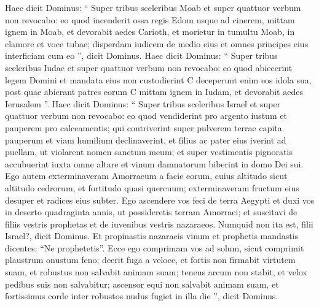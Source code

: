 \begin{biblechapter}
\begin{biblechapter}
 \verse Haec dicit Dominus:
 “ Super tribus sceleribus Moab
 et super quattuor verbum non revocabo:
 eo quod incenderit ossa regis Edom
 usque ad cinerem,
 \verse mittam ignem in Moab,
 et devorabit aedes Carioth,
 et morietur in tumultu Moab,
 in clamore et voce tubae;
 \verse disperdam iudicem de medio eius
 et omnes principes eius interficiam cum eo ”,
 dicit Dominus.
 \verse Haec dicit Dominus:
 “ Super tribus sceleribus Iudae
 et super quattuor verbum non revocabo:
 eo quod abiecerint legem Domini
 et mandata eius non custodierint
 C deceperunt enim eos idola sua,
 post quae abierant patres eorum C
 \verse mittam ignem in Iudam,
 et devorabit aedes Ierusalem ”.
 \verse Haec dicit Dominus:
 “ Super tribus sceleribus Israel
 et super quattuor verbum non revocabo:
 eo quod vendiderint pro argento iustum
 et pauperem pro calceamentis;
 \verse qui contriverint super pulverem terrae capita pauperum
 et viam humilium declinaverint,
 et filius ac pater eius iverint ad puellam,
 ut violarent nomen sanctum meum;
 \verse et super vestimentis pignoratis accubuerint
 iuxta omne altare
 et vinum damnatorum biberint
 in domo Dei sui.
 \verse Ego autem exterminaveram
 Amorraeum a facie eorum,
 cuius altitudo sicut altitudo cedrorum,
 et fortitudo quasi quercuum;
 exterminaveram fructum eius desuper
 et radices eius subter.
 \verse Ego ascendere vos feci
 de terra Aegypti
 et duxi vos in deserto
 quadraginta annis,
 ut possideretis terram Amorraei;
 \verse et suscitavi de filiis vestris prophetas et de iuvenibus vestris nazaraeos.
 Numquid non ita est, filii Israel?,
 dicit Dominus.
 \verse Et propinastis nazaraeis vinum
 et prophetis mandastis dicentes:
 “Ne prophetetis”.
 \verse Ecce ego comprimam vos ad solum,
 sicut comprimit plaustrum
 onustum feno;
 \verse deerit fuga a veloce,
 et fortis non firmabit virtutem suam,
 et robustus non salvabit animam suam;
 \verse tenens arcum non stabit,
 et velox pedibus suis non salvabitur;
 ascensor equi non salvabit animam suam,
 \verse et fortissimus corde inter robustos
 nudus fugiet in illa die ”,
 dicit Dominus.
 

\end{biblechapter}
\end{biblechapter}
